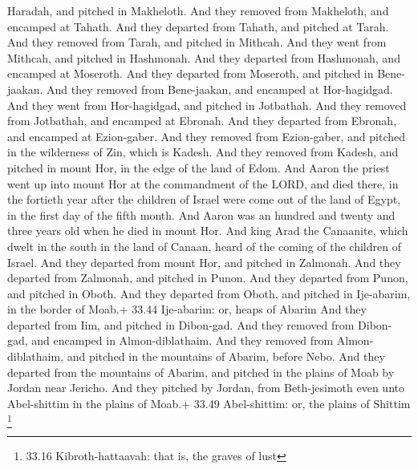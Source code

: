 Haradah, and pitched in Makheloth.  And they removed from
Makheloth, and encamped at Tahath.  And they departed from
Tahath, and pitched at Tarah.  And they removed from Tarah,
and pitched in Mithcah.  And they went from Mithcah, and
pitched in Hashmonah.  And they departed from Hashmonah,
and encamped at Moseroth.  And they departed from Moseroth,
and pitched in Bene-jaakan.  And they removed from
Bene-jaakan, and encamped at Hor-hagidgad.  And they went
from Hor-hagidgad, and pitched in Jotbathah.  And they
removed from Jotbathah, and encamped at Ebronah.  And they
departed from Ebronah, and encamped at Ezion-gaber.  And
they removed from Ezion-gaber, and pitched in the wilderness of Zin,
which is Kadesh.  And they removed from Kadesh, and pitched
in mount Hor, in the edge of the land of Edom.  And Aaron
the priest went up into mount Hor at the commandment of the LORD, and
died there, in the fortieth year after the children of Israel were come
out of the land of Egypt, in the first day of the fifth month.
 And Aaron was an hundred and twenty and three years old
when he died in mount Hor.  And king Arad the Canaanite,
which dwelt in the south in the land of Canaan, heard of the coming of
the children of Israel.  And they departed from mount Hor,
and pitched in Zalmonah.  And they departed from Zalmonah,
and pitched in Punon.  And they departed from Punon, and
pitched in Oboth.  And they departed from Oboth, and
pitched in Ije-abarim, in the border of Moab.+ 33.44 Ije-abarim: or,
heaps of Abarim  And they departed from Iim, and pitched in
Dibon-gad.  And they removed from Dibon-gad, and encamped
in Almon-diblathaim.  And they removed from
Almon-diblathaim, and pitched in the mountains of Abarim, before Nebo.
 And they departed from the mountains of Abarim, and
pitched in the plains of Moab by Jordan near Jericho.  And
they pitched by Jordan, from Beth-jesimoth even unto Abel-shittim in the
plains of Moab.+ 33.49 Abel-shittim: or, the plains of Shittim
\footnote{33.16 Kibroth-hattaavah: that is, the graves of lust}

